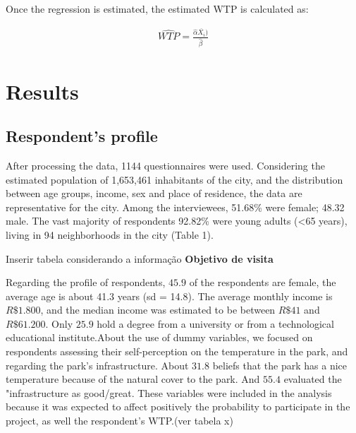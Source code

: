 \documentclass[
]{article}
\begin{document}
Once the regression is estimated, the estimated WTP is calculated as:

\begin{align}
\widehat{WTP} = \frac{\hat{\alpha}\overline{X_{i}})}{\hat{\beta}} 
\end{align}

\hypertarget{sec:3}{%
\section{Results}\label{sec:3}}

\hypertarget{respondents-profile}{%
\subsection{Respondent's profile}\label{respondents-profile}}

After processing the data, 1144 questionnaires were used. Considering
the estimated population of 1,653,461 inhabitants of the city, and the
distribution between age groups, income, sex and place of residence, the
data are representative for the city. Among the interviewees, 51.68\%
were female; 48.32 male. The vast majority of respondents 92.82\% were
young adults (\textless65 years), living in 94 neighborhoods in the city
(Table 1).

Inserir tabela considerando a informação \textbf{Objetivo de visita}

Regarding the profile of respondents, \(45.9%
\) of the respondents are female, the average age is about 41.3 years
(sd = 14.8). The average monthly income is \(R\$ 1.800\), and the median
income was estimated to be between \(R\$ 41\) and \(R\$ 61.200\). Only
\(25.9%
\) hold a degree from a university or from a technological educational
institute.About the use of dummy variables, we focused on respondents
assessing their self-perception on the temperature in the park, and
regarding the park's infrastructure. About \(31.8%
\) beliefs that the park has a nice temperature because of the natural
cover to the park. And \(55.4%
\) evaluated the "infrastructure as good/great. These variables were
included in the analysis because it was expected to affect positively
the probability to participate in the project, as well the respondent's
WTP.(ver tabela x)
\end{document}
